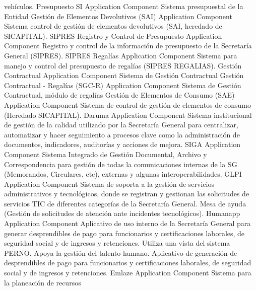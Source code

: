 \documentclass[
	a4paper, %
	12pt, %
]{include/CSSullivanBusinessReport}
\begin{document}
vehículos. \textbar{} \textbar{} Presupuesto SI \textbar{} Application
Component \textbar{} Sistema presupuestal de la Entidad \textbar{}
\textbar{} Gestión de Elementos Devolutivos (SAI) \textbar{} Application
Component \textbar{} Sistema control de gestión de elementos devolutivos
(SAI, heredado de SICAPITAL). \textbar{} \textbar{} SIPRES Registro y
Control de Presupuesto \textbar{} Application Component \textbar{}
Registro y control de la información de presupuesto de la Secretaría
General (SIPRES). \textbar{} \textbar{} SIPRES Regalías \textbar{}
Application Component \textbar{} Sistema para manejo y control del
presupuesto de regalías (SIPRES REGALIAS). \textbar{} \textbar{} Gestión
Contractual \textbar{} Application Component \textbar{} Sistema de
Gestión Contractual \textbar{} \textbar{} Gestión Contractual - Regalías
(SGC-R) \textbar{} Application Component \textbar{} Sistema de Gestión
Contractual, módulo de regalías \textbar{} \textbar{} Gestión de
Elementos de Consumo (SAE) \textbar{} Application Component \textbar{}
Sistema de control de gestión de elementos de consumo (Heredado
SICAPITAL). \textbar{} \textbar{} Daruma \textbar{} Application
Component \textbar{} Sistema institucional de gestión de la calidad
utilizado por la Secretaría General para centralizar, automatizar y
hacer seguimiento a procesos clave como la administración de documentos,
indicadores, auditorías y acciones de mejora. \textbar{} \textbar{} SIGA
\textbar{} Application Component \textbar{} Sistema Integrado de Gestión
Documental, Archivo y Correspondencia para gestión de todas la
comunicaciones internas de la SG (Memorandos, Circulares, etc), externas
y algunas interoperabilidades. \textbar{} \textbar{} GLPI \textbar{}
Application Component \textbar{} Sistema de soporta a la gestión de
servicios administrativos y tecnológicos, donde se registran y gestionan
las solicitudes de servicios TIC de diferentes categorías de la
Secretaría General. Mesa de ayuda (Gestión de solicitudes de atención
ante incidentes tecnológicos). \textbar{} \textbar{} Humanapp \textbar{}
Application Component \textbar{} Aplicativo de uso interno de la
Secretaría General para generar desprendibles de pago para funcionarios
y certificaciones laborales, de seguridad social y de ingresos y
retenciones. Utiliza una vista del sistema PERNO. Apoya la gestión del
talento humano. Aplicativo de generación de desprendibles de pago para
funcionarios y certificaciones laborales, de seguridad social y de
ingresos y retenciones. \textbar{} \textbar{} Emlaze \textbar{}
Application Component \textbar{} Sistema para la planeación de recursos
\end{document}
